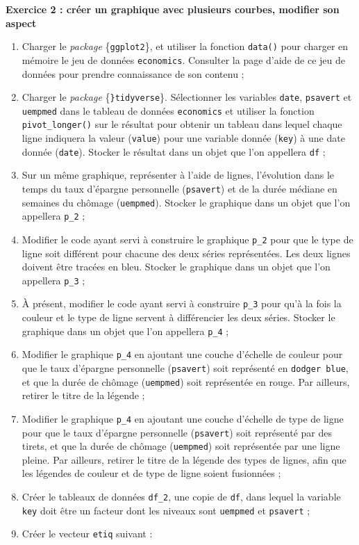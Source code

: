 \documentclass[
  11pt,
]{book}
\makeatletter
\numberwithin{equation}{section}
\numberwithin{countremarque}{section}
\newenvironment{exframe}{%
 \def\at@end@of@exframe{}%
 \ifinner\ifhmode%
  \def\at@end@of@exframe{\end{minipage}}%
  \begin{minipage}{\columnwidth}%
 \fi\fi%
 \def\FrameCommand##1{\hskip\@totalleftmargin \hskip-\fboxsep
 \colorbox{shadecolorex}{##1}\hskip-\fboxsep
     \hskip-\linewidth \hskip-\@totalleftmargin \hskip\columnwidth}%
 \MakeFramed {\advance\hsize-\width
   \@totalleftmargin\z@ \linewidth\hsize
   \@setminipage}}%
 {\par\unskip\endMakeFramed%
 \at@end@of@exframe}
\makeatother
\begin{document}
\begin{exframe}
\textbf{Exercice 2 : créer un graphique avec plusieurs courbes, modifier son aspect}

\begin{enumerate}
\def\labelenumi{\arabic{enumi}.}
\item
  Charger le \emph{package} \{\texttt{ggplot2}\}, et utiliser la fonction \texttt{data()} pour charger en mémoire le jeu de données \texttt{economics}. Consulter la page d'aide de ce jeu de données pour prendre connaissance de son contenu ;
\item
  Charger le \emph{package} \{\texttt{\}tidyverse}\}. Sélectionner les variables \texttt{date}, \texttt{psavert} et \texttt{uempmed} dans le tableau de données \texttt{economics} et utiliser la fonction \texttt{pivot\_longer()} sur le résultat pour obtenir un tableau dans lequel chaque ligne indiquera la valeur (\texttt{value}) pour une variable donnée (\texttt{key}) à une date donnée (\texttt{date}). Stocker le résultat dans un objet que l'on appellera \texttt{df} ;
\item
  Sur un même graphique, représenter à l'aide de lignes, l'évolution dans le temps du taux d'épargne personnelle (\texttt{psavert}) et de la durée médiane en semaines du chômage (\texttt{uempmed}). Stocker le graphique dans un objet que l'on appellera \texttt{p\_2} ;
\item
  Modifier le code ayant servi à construire le graphique \texttt{p\_2} pour que le type de ligne soit différent pour chacune des deux séries représentées. Les deux lignes doivent être tracées en bleu. Stocker le graphique dans un objet que l'on appellera \texttt{p\_3} ;
\item
  À présent, modifier le code ayant servi à construire \texttt{p\_3} pour qu'à la fois la couleur et le type de ligne servent à différencier les deux séries. Stocker le graphique dans un objet que l'on appellera \texttt{p\_4} ;
\item
  Modifier le graphique \texttt{p\_4} en ajoutant une couche d'échelle de couleur pour que le taux d'épargne personnelle (\texttt{psavert}) soit représenté en \texttt{dodger\ blue}, et que la durée de chômage (\texttt{uempmed}) soit représentée en rouge. Par ailleurs, retirer le titre de la légende ;
\item
  Modifier le graphique \texttt{p\_4} en ajoutant une couche d'échelle de type de ligne pour que le taux d'épargne personnelle (\texttt{psavert}) soit représenté par des tirets, et que la durée de chômage (\texttt{uempmed}) soit représentée par une ligne pleine. Par ailleurs, retirer le titre de la légende des types de lignes, afin que les légendes de couleur et de type de ligne soient fusionnées ;
\item
  Créer le tableaux de données \texttt{df\_2}, une copie de \texttt{df}, dans lequel la variable \texttt{key} doit être un facteur dont les niveaux sont \texttt{uempmed} et \texttt{psavert} ;
\item
  Créer le vecteur \texttt{etiq} suivant :


\end{enumerate}
\end{exframe}
\end{document}
